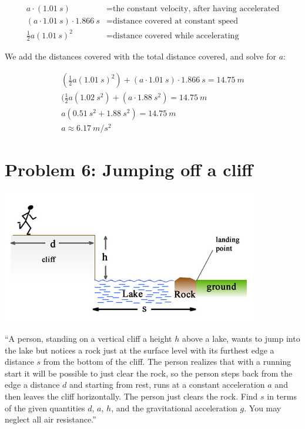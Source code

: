 \documentclass[12pt,a4paper]{report}
\begin{document}
\begin{align}
a \cdot (\SI{1.01}{s}) &= \text{the constant velocity, after having accelerated}\\
(a \cdot \SI{1.01}{s}) \cdot \SI{1.866}{s} &= \text{distance covered at constant speed}\\
\frac{1}{2} a (\SI{1.01}{s})^2 &= \text{distance covered while accelerating}
\end{align}

We add the distances covered with the total distance covered, and solve for $a$:

\begin{align}
(\frac{1}{2} a (\SI{1.01}{s})^2) + (a \cdot \SI{1.01}{s}) \cdot \SI{1.866}{s} = \SI{14.75}{m}\\
(\frac{1}{2} a (\SI{1.02}{s^2}) + (a \cdot \SI{1.88}{s^2}) = \SI{14.75}{m}\\
a (\SI{0.51}{s^2} + \SI{1.88}{s^2}) = \SI{14.75}{m}\\
a \approx \SI{6.17}{m/s^2}
\end{align}

\section{Problem 6: Jumping off a cliff}

\begin{center}
\includegraphics[scale=0.75]{Graphics/h2p6}
\end{center}

``A person, standing on a vertical cliff a height $h$ above a lake, wants to jump into the lake but notices a rock just at the surface level with its furthest edge a distance $s$ from the bottom of the cliff. The person realizes that with a running start it will be possible to just clear the rock, so the person steps back from the edge a distance $d$ and starting from rest, runs at a constant acceleration $a$ and then leaves the cliff horizontally. The person just clears the rock. Find $s$ in terms of the given quantities $d$, $a$, $h$, and the gravitational acceleration $g$. You may neglect all air resistance.''
\end{document}
